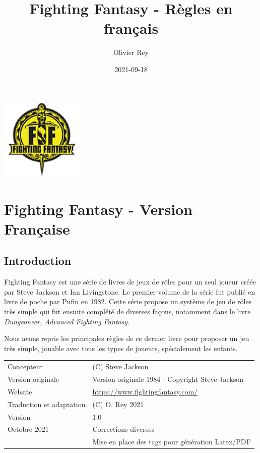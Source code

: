 \documentclass[a4paper, 11pt, twoside]{article}
\author{Olivier Rey}
\date{2021-09-18}
\title{Fighting Fantasy - Règles en français}
\begin{document}
\maketitle
\tableofcontents

\newpage

\begin{center}
\includegraphics[width=4cm]{FF2018.png}
\end{center}

\section{Fighting Fantasy - Version Française}
\label{sec:org7d1c4c3}

\subsection{Introduction}
\label{sec:orge270066}

Fighting Fantasy est une série de livres de jeux de rôles pour un seul joueur créée par Steve Jackson et Ian Livingstone. Le premier volume de la série fut publié en livre de poche par Pufin en 1982. Cette série propose un système de jeu de rôles très simple qui fut ensuite complété de diverses façons, notamment dans le livre \emph{Dungeoneer, Advanced Fighting Fantasy}.

Nous avons repris les principales règles de ce dernier livre pour proposer un jeu très simple, jouable avec tous les types de joueurs, spécialement les enfants.

\begin{longtable}{ll}
Concepteur & (C) Steve Jackson\\
Version originale & Version originale 1984 - Copyright Steve Jackson\\
Website & \href{https://www.fightingfantasy.com/}{https://www.fightingfantasy.com/}\\
Traduction et adaptation & (C) O. Rey 2021\\
Version & 1.0\\
Octobre 2021 & Corrections diverses\\
 & Mise en place des tags pour génération Latex/PDF\\
\end{longtable}
\end{document}
